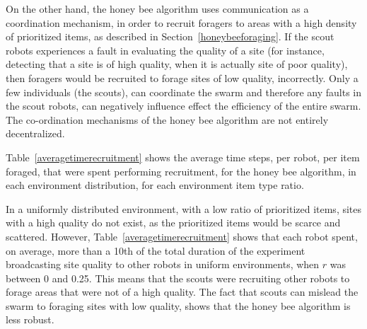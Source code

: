 On the other hand, the honey bee algorithm uses communication as a coordination mechanism, in order to recruit foragers to areas with a high density of prioritized items, as described in Section~\ref{honeybeeforaging}. If the scout robots experiences a fault in evaluating the quality of a site (for instance, detecting that a site is of high quality, when it is actually site of poor quality), then foragers would be recruited to forage sites of low quality, incorrectly. Only a few individuals (the scouts), can coordinate the swarm and therefore any faults in the scout robots, can negatively influence effect the efficiency of the entire swarm. The co-ordination mechanisms of the honey bee algorithm are not entirely decentralized.

Table~\ref{averagetimerecruitment} shows the average time steps, per robot, per item foraged, that were spent performing recruitment, for the honey bee algorithm, in each environment distribution, for each environment item type ratio. 

In a uniformly distributed environment, with a low ratio of prioritized items, sites with a high quality do not exist, as the prioritized items would be scarce and scattered. However, Table~\ref{averagetimerecruitment} shows that each robot spent, on average, more than a 10th of the total duration of the experiment broadcasting site quality to other robots in uniform environments, when $r$ was between 0 and 0.25. This means that the scouts were recruiting other robots to forage areas that were not of a high quality. The fact that scouts can mislead the swarm to foraging sites with low quality, shows that the honey bee algorithm is less robust.

